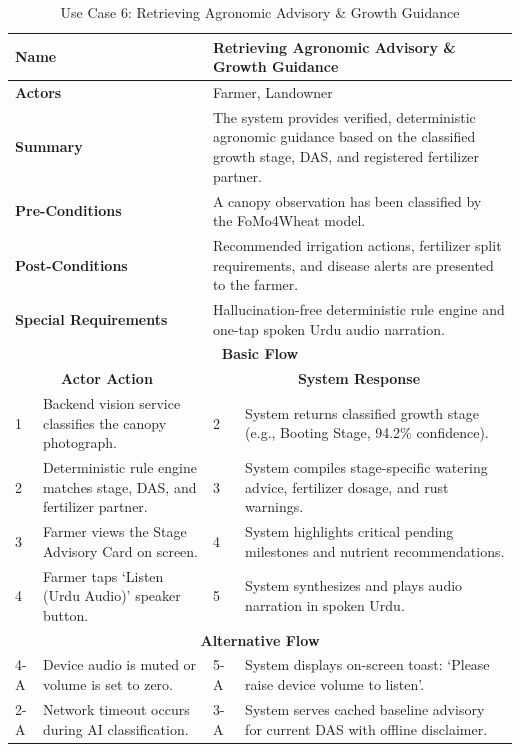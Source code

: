 \begin{table}[H]
\small
\centering
\caption{Use Case 6: Retrieving Agronomic Advisory \& Growth Guidance}
\label{tab:uc6}
\begin{tabular}{|p{0.6cm}|p{6.4cm}|p{0.8cm}|p{6.6cm}|}
\hline
\multicolumn{2}{|p{7.0cm}|}{\textbf{Name}} & \multicolumn{2}{p{7.4cm}|}{Retrieving Agronomic Advisory \& Growth Guidance} \\ \hline
\multicolumn{2}{|p{7.0cm}|}{\textbf{Actors}} & \multicolumn{2}{p{7.4cm}|}{Farmer, Landowner} \\ \hline
\multicolumn{2}{|p{7.0cm}|}{\textbf{Summary}} & \multicolumn{2}{p{7.4cm}|}{The system provides verified, deterministic agronomic guidance based on the classified growth stage, DAS, and registered fertilizer partner.} \\ \hline
\multicolumn{2}{|p{7.0cm}|}{\textbf{Pre-Conditions}} & \multicolumn{2}{p{7.4cm}|}{A canopy observation has been classified by the FoMo4Wheat model.} \\ \hline
\multicolumn{2}{|p{7.0cm}|}{\textbf{Post-Conditions}} & \multicolumn{2}{p{7.4cm}|}{Recommended irrigation actions, fertilizer split requirements, and disease alerts are presented to the farmer.} \\ \hline
\multicolumn{2}{|p{7.0cm}|}{\textbf{Special Requirements}} & \multicolumn{2}{p{7.4cm}|}{Hallucination-free deterministic rule engine and one-tap spoken Urdu audio narration.} \\ \hline
\multicolumn{4}{|c|}{\textbf{Basic Flow}} \\ \hline
\multicolumn{2}{|c|}{\textbf{Actor Action}} & \multicolumn{2}{c|}{\textbf{System Response}} \\ \hline
1 & Backend vision service classifies the canopy photograph. & 2 & System returns classified growth stage (e.g., Booting Stage, 94.2\% confidence). \\ \hline
2 & Deterministic rule engine matches stage, DAS, and fertilizer partner. & 3 & System compiles stage-specific watering advice, fertilizer dosage, and rust warnings. \\ \hline
3 & Farmer views the Stage Advisory Card on screen. & 4 & System highlights critical pending milestones and nutrient recommendations. \\ \hline
4 & Farmer taps `Listen (Urdu Audio)' speaker button. & 5 & System synthesizes and plays audio narration in spoken Urdu. \\ \hline
\multicolumn{4}{|c|}{\textbf{Alternative Flow}} \\ \hline
4-A & Device audio is muted or volume is set to zero. & 5-A & System displays on-screen toast: `Please raise device volume to listen'. \\ \hline
2-A & Network timeout occurs during AI classification. & 3-A & System serves cached baseline advisory for current DAS with offline disclaimer. \\ \hline
\end{tabular}
\end{table}

